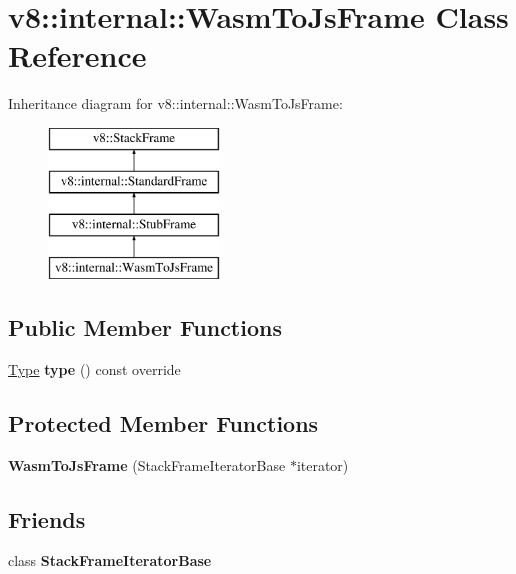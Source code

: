 \hypertarget{classv8_1_1internal_1_1_wasm_to_js_frame}{}\section{v8\+:\+:internal\+:\+:Wasm\+To\+Js\+Frame Class Reference}
\label{classv8_1_1internal_1_1_wasm_to_js_frame}
Inheritance diagram for v8\+:\+:internal\+:\+:Wasm\+To\+Js\+Frame\+:\begin{figure}[H]
\begin{center}
\leavevmode
\includegraphics[height=4.000000cm]{classv8_1_1internal_1_1_wasm_to_js_frame}
\end{center}
\end{figure}
\subsection*{Public Member Functions}
\begin{DoxyCompactItemize}
\item 
\hyperlink{classv8_1_1internal_1_1_type}{Type} {\bfseries type} () const  override\hypertarget{classv8_1_1internal_1_1_wasm_to_js_frame_a6d3a0e529f8639f0a5f5b70c7f2b70a9}{}\label{classv8_1_1internal_1_1_wasm_to_js_frame_a6d3a0e529f8639f0a5f5b70c7f2b70a9}

\end{DoxyCompactItemize}
\subsection*{Protected Member Functions}
\begin{DoxyCompactItemize}
\item 
{\bfseries Wasm\+To\+Js\+Frame} (Stack\+Frame\+Iterator\+Base $\ast$iterator)\hypertarget{classv8_1_1internal_1_1_wasm_to_js_frame_a8ab84dfa559464ea3f0d728bd1fff083}{}\label{classv8_1_1internal_1_1_wasm_to_js_frame_a8ab84dfa559464ea3f0d728bd1fff083}

\end{DoxyCompactItemize}
\subsection*{Friends}
\begin{DoxyCompactItemize}
\item 
class {\bfseries Stack\+Frame\+Iterator\+Base}\hypertarget{classv8_1_1internal_1_1_wasm_to_js_frame_ac7310421866976ca454bbe11c5f926c3}{}\label{classv8_1_1internal_1_1_wasm_to_js_frame_ac7310421866976ca454bbe11c5f926c3}

\end{DoxyCompactItemize}
